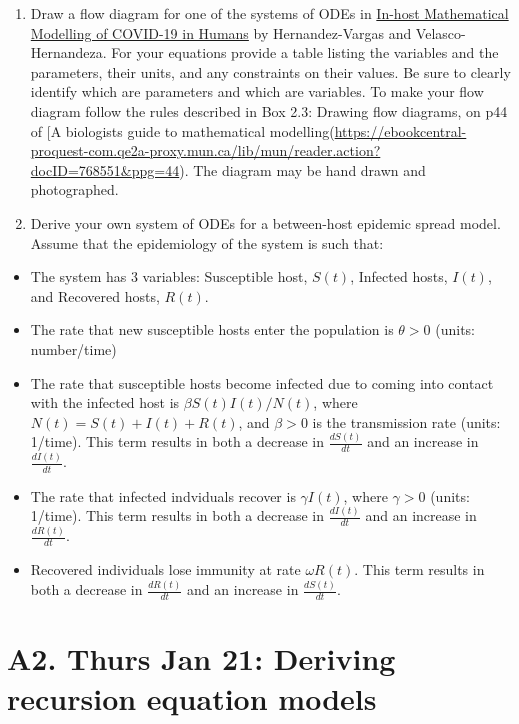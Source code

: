 \documentclass[]{book}
\begin{document}
\begin{enumerate}
\def\labelenumi{\arabic{enumi}.}
\item
  Draw a flow diagram for one of the systems of ODEs in
  \href{https://www-ncbi-nlm-nih-gov.qe2a-proxy.mun.ca/pmc/articles/PMC7526677/}{In-host
  Mathematical Modelling of COVID-19 in Humans} by Hernandez-Vargas and
  Velasco-Hernandeza. For your equations provide a table listing the
  variables and the parameters, their units, and any constraints on
  their values. Be sure to clearly identify which are parameters and
  which are variables. To make your flow diagram follow the rules
  described in Box 2.3: Drawing flow diagrams, on p44 of {[}A biologists
  guide to mathematical
  modelling(\url{https://ebookcentral-proquest-com.qe2a-proxy.mun.ca/lib/mun/reader.action?docID=768551\&ppg=44}).
  The diagram may be hand drawn and photographed.
\item
  Derive your own system of ODEs for a between-host epidemic spread
  model. Assume that the epidemiology of the system is such that:
\end{enumerate}

\begin{itemize}
\item
  The system has 3 variables: Susceptible host, \(S(t)\), Infected
  hosts, \(I(t)\), and Recovered hosts, \(R(t)\).
\item
  The rate that new susceptible hosts enter the population is
  \(\theta>0\) (units: number/time)
\item
  The rate that susceptible hosts become infected due to coming into
  contact with the infected host is \(\beta S(t) I(t)/N(t)\), where
  \(N(t) = S(t) + I(t) + R(t)\), and \(\beta>0\) is the transmission
  rate (units: 1/time). This term results in both a decrease in
  \(\frac{dS(t)}{dt}\) and an increase in \(\frac{dI(t)}{dt}\).
\item
  The rate that infected indviduals recover is \(\gamma I(t)\), where
  \(\gamma >0\) (units: 1/time). This term results in both a decrease in
  \(\frac{dI(t)}{dt}\) and an increase in \(\frac{dR(t)}{dt}\).
\item
  Recovered individuals lose immunity at rate \(\omega R(t)\). This term
  results in both a decrease in \(\frac{dR(t)}{dt}\) and an increase in
  \(\frac{dS(t)}{dt}\).
\end{itemize}

\chapter{A2. Thurs Jan 21: Deriving recursion equation
models}\label{a2.-thurs-jan-21-deriving-recursion-equation-models}
\end{document}
